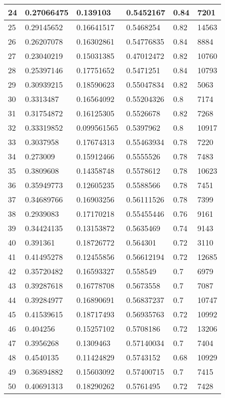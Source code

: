 \begin{longtable}{|l|l|l|l|l|l|}
24 & 0.27066475 & 0.139103 & 0.5452167 & 0.84 & 7201 \\ \hline 
25 & 0.29145652 & 0.16641517 & 0.5468254 & 0.82 & 14563 \\ \hline 
26 & 0.26207078 & 0.16302861 & 0.54776835 & 0.84 & 8884 \\ \hline 
27 & 0.23040219 & 0.15031385 & 0.47012472 & 0.82 & 10760 \\ \hline 
28 & 0.25397146 & 0.17751652 & 0.5471251 & 0.84 & 10793 \\ \hline 
29 & 0.30939215 & 0.18590623 & 0.55047834 & 0.82 & 5063 \\ \hline 
30 & 0.3313487 & 0.16564092 & 0.55204326 & 0.8 & 7174 \\ \hline 
31 & 0.31754872 & 0.16125305 & 0.5526678 & 0.82 & 7268 \\ \hline 
32 & 0.33319852 & 0.099561565 & 0.5397962 & 0.8 & 10917 \\ \hline 
33 & 0.3037958 & 0.17674313 & 0.55463934 & 0.78 & 7220 \\ \hline 
34 & 0.273009 & 0.15912466 & 0.5555526 & 0.78 & 7483 \\ \hline 
35 & 0.3809608 & 0.14358748 & 0.5578612 & 0.78 & 10623 \\ \hline 
36 & 0.35949773 & 0.12605235 & 0.5588566 & 0.78 & 7451 \\ \hline 
37 & 0.34689766 & 0.16903256 & 0.56111526 & 0.78 & 7399 \\ \hline 
38 & 0.2939083 & 0.17170218 & 0.55455446 & 0.76 & 9161 \\ \hline 
39 & 0.34424135 & 0.13153872 & 0.5635469 & 0.74 & 9143 \\ \hline 
40 & 0.391361 & 0.18726772 & 0.564301 & 0.72 & 3110 \\ \hline 
41 & 0.41495278 & 0.12455856 & 0.56612194 & 0.72 & 12685 \\ \hline 
42 & 0.35720482 & 0.16593327 & 0.558549 & 0.7 & 6979 \\ \hline 
43 & 0.39287618 & 0.16778708 & 0.5673558 & 0.7 & 7087 \\ \hline 
44 & 0.39284977 & 0.16890691 & 0.56837237 & 0.7 & 10747 \\ \hline 
45 & 0.41539615 & 0.18717493 & 0.56935763 & 0.72 & 10992 \\ \hline 
46 & 0.404256 & 0.15257102 & 0.5708186 & 0.72 & 13206 \\ \hline 
47 & 0.3956268 & 0.1309463 & 0.57140034 & 0.7 & 7404 \\ \hline 
48 & 0.4540135 & 0.11424829 & 0.5743152 & 0.68 & 10929 \\ \hline 
49 & 0.36894882 & 0.15603092 & 0.57400715 & 0.7 & 7415 \\ \hline 
50 & 0.40691313 & 0.18290262 & 0.5761495 & 0.72 & 7428 \\ \hline 
\end{longtable}